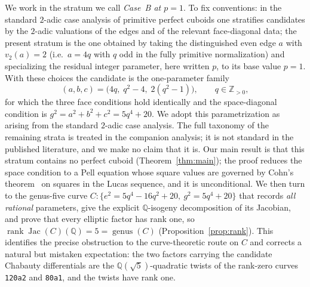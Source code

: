 \documentclass[11pt,reqno]{amsart}
\theoremstyle{plain}
\theoremstyle{definition}
\newcommand{\Q}{\mathbb{Q}}
\newcommand{\Z}{\mathbb{Z}}
\DeclareMathOperator{\Jac}{Jac}
\DeclareMathOperator{\rank}{rank}
\begin{document}
We work in the stratum we call \emph{Case~B at $p=1$}. To fix conventions: in
the standard $2$-adic case analysis of primitive perfect cuboids one stratifies
candidates by the $2$-adic valuations of the edges and of the relevant
face-diagonal data; the present stratum is the one obtained by taking the
distinguished even edge $a$ with $v_2(a)=2$ (i.e.\ $a=4q$ with $q$ odd in the
fully primitive normalization) and specializing the residual integer parameter,
here written $p$, to its base value $p=1$. With these choices the candidate is
the one-parameter family
\begin{equation}\label{eq:caseB}
(a,b,c)=\bigl(4q,\;q^2-4,\;2(q^2-1)\bigr),\qquad q\in\Z_{>0},
\end{equation}
for which the three face conditions hold identically and the space-diagonal
condition is $g^2=a^2+b^2+c^2=5q^4+20$. We adopt this parametrization as arising
from the standard $2$-adic case analysis. The full taxonomy of the remaining
strata is treated in the companion analysis; it is not standard in the
published literature, and we make no claim that it is. Our main result is that
this stratum contains no perfect cuboid (Theorem~\ref{thm:main}); the proof
reduces the space condition to a Pell equation whose square values are governed
by Cohn's theorem~\cite{cohn,cohnlucas} on squares in the Lucas sequence, and it
is unconditional. We then turn to the genus-five curve
$C:\{e^2=5q^4-16q^2+20,\ g^2=5q^4+20\}$ that
records \emph{all rational} parameters, give the explicit $\Q$-isogeny
decomposition of its Jacobian, and prove that every elliptic factor has rank
one, so $\rank\Jac(C)(\Q)=5=\operatorname{genus}(C)$
(Proposition~\ref{prop:rank}). This identifies the precise obstruction to the
curve-theoretic route on $C$ and corrects a natural but mistaken expectation:
the two factors carrying the candidate Chabauty differentials are the
$\Q(\sqrt5)$-quadratic twists of the rank-zero curves \texttt{120a2} and
\texttt{80a1}, and the twists have rank one.
\end{document}
